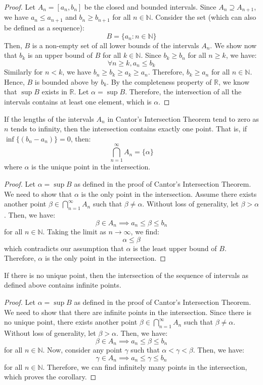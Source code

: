 \documentclass[openany]{book}
\begin{document}
\begin{proof}
Let $A_n = [a_n, b_n]$ be the closed and bounded intervals. Since $A_n \supseteq A_{n+1}$, we have $a_n \leq a_{n+1}$ and $b_n \geq b_{n+1}$ for all $n \in \mathbb{N}$. Consider the set (which can also be defined as a sequence): 
$$B = \{a_n: n \in \mathbb{N}\}$$
Then, $B$ is a non-empty set of all lower bounds of the intervals $A_n$. We show now that $b_k$ is an upper bound of $B$ for all $k \in \mathbb{N}$. Since $b_k \geq b_n$ for all $n \geq k$, we have:
$$\forall n \geq k, a_n \leq b_k$$
Similarly for $n < k$, we have $b_n \geq b_k \geq a_k \geq a_n$. Therefore, $b_k \geq a_n$ for all $n \in \mathbb{N}$. Hence, $B$ is bounded above by $b_k$. By the completeness property of $\mathbb{R}$, we know that $\sup B$ exists in $\mathbb{R}$. Let $\alpha = \sup B$. Therefore, the intersection of all the intervals contains at least one element, which is $\alpha$.
\end{proof}
\begin{corollary}
    If the lengths of the intervals $A_n$ in Cantor's Intersection Theorem tend to zero as $n$ tends to infinity, then the intersection contains exactly one point. That is, if $\inf\{(b_n - a_n)\} = 0$, then:
    $$\bigcap_{n=1}^{\infty} A_n = \{\alpha\}$$
    where $\alpha$ is the unique point in the intersection.
\end{corollary}
\begin{proof}
Let $\alpha = \sup B$ as defined in the proof of Cantor's Intersection Theorem. We need to show that $\alpha$ is the only point in the intersection. Assume there exists another point $\beta \in \bigcap_{n=1}^{\infty} A_n$ such that $\beta \neq \alpha$. Without loss of generality, let $\beta > \alpha$. Then, we have:
$$\beta \in A_n \implies a_n \leq \beta \leq b_n$$
for all $n \in \mathbb{N}$. Taking the limit as $n \to \infty$, we find:
$$\alpha \leq \beta$$
which contradicts our assumption that $\alpha$ is the least upper bound of $B$. Therefore, $\alpha$ is the only point in the intersection.
\end{proof}
\begin{corollary}
    If there is no unique point, then the intersection of the sequence of intervals as defined above contains infinite points. 
\end{corollary}
\begin{proof}
    Let $\alpha = \sup B$ as defined in the proof of Cantor's Intersection Theorem. We need to show that there are infinite points in the intersection. Since there is no unique point, there exists another point $\beta \in \bigcap_{n=1}^{\infty} A_n$ such that $\beta \neq \alpha$. Without loss of generality, let $\beta > \alpha$. Then, we have:
$$\beta \in A_n \implies a_n \leq \beta \leq b_n$$
for all $n \in \mathbb{N}$. Now, consider any point $\gamma$ such that $\alpha < \gamma < \beta$. Then, we have:
$$\gamma \in A_n \implies a_n \leq \gamma \leq b_n$$
for all $n \in \mathbb{N}$. Therefore, we can find infinitely many points in the intersection, which proves the corollary.
\end{proof}
\end{document}
